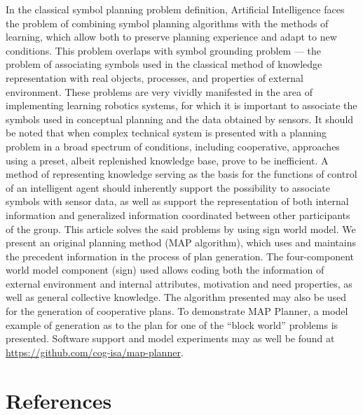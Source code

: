 \documentclass[review]{elsarticle}
\begin{document}
In the classical symbol planning problem definition, Artificial Intelligence faces the problem of combining symbol planning algorithms with the methods of learning, which allow both to preserve planning experience and adapt to new conditions. This problem overlaps with symbol grounding problem --- the problem of associating symbols used in the classical method of knowledge representation with real objects, processes, and properties of external environment. These problems are very vividly manifested in the area of implementing learning robotics systems, for which it is important to associate the symbols used in conceptual planning and the data obtained by sensors. It should be noted that when complex technical system is presented with a planning problem in a broad spectrum of conditions, including cooperative, approaches using a preset, albeit replenished knowledge base, prove to be inefficient. A method of representing knowledge serving as the basis for the functions of control of an intelligent agent should inherently support the possibility to associate symbols with sensor data, as well as support the representation of both internal information and generalized information coordinated between other participants of the group. This article solves the said problems by using sign world model. We present an original planning method (MAP algorithm), which uses and maintains the precedent information in the process of plan generation. The four-component world model component (sign) used allows coding both the information of external environment and internal attributes, motivation and need properties, as well as general collective knowledge. The algorithm presented may also be used for the generation of cooperative plans. To demonstrate MAP Planner, a model example of generation as to the plan for one of the ``block world'' problems is presented. Software support and model experiments may as well be found at \href{https://github.com/cog-isa/map-planner}{https://github.com/cog-isa/map-planner}.

\section*{References}


\end{document}
